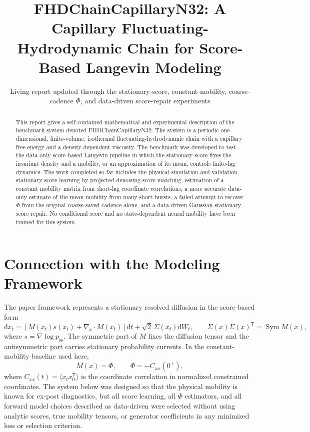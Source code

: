 \documentclass[11pt]{article}
\title{FHDChainCapillaryN32: A Capillary Fluctuating-Hydrodynamic Chain for Score-Based Langevin Modeling}
\author{}
\date{Living report updated through the stationary-score, constant-mobility, coarse-cadence \(\Phi\), and data-driven score-repair experiments}
\newcommand{\dd}{\mathrm{d}}
\newcommand{\Sym}{\operatorname{Sym}}
\newcommand{\transpose}{\mathsf T}
\begin{document}
\maketitle

\begin{abstract}
This report gives a self-contained mathematical and experimental description of the benchmark system denoted FHDChainCapillaryN32.  The system is a periodic one-dimensional, finite-volume, isothermal fluctuating-hydrodynamic chain with a capillary free energy and a density-dependent viscosity.  The benchmark was developed to test the data-only score-based Langevin pipeline in which the stationary score fixes the invariant density and a mobility, or an approximation of its mean, controls finite-lag dynamics.  The work completed so far includes the physical simulation and validation, stationary score learning by projected denoising score matching, estimation of a constant mobility matrix from short-lag coordinate correlations, a more accurate data-only estimate of the mean mobility from many short bursts, a failed attempt to recover \(\Phi\) from the original coarse saved cadence alone, and a data-driven Gaussian stationary-score repair.  No conditional score and no state-dependent neural mobility have been trained for this system.
\end{abstract}

\section{Connection with the Modeling Framework}

The paper framework represents a stationary resolved diffusion in the score-based form
\begin{equation}
    \dd x_t
    =
    \left[
        M(x_t)s(x_t)+\nabla_x\!\cdot M(x_t)
    \right]\dd t
    +
    \sqrt{2}\,\Sigma(x_t)\dd W_t,
    \qquad
    \Sigma(x)\Sigma(x)^\transpose=\Sym M(x),
    \label{eq:score_based_sde}
\end{equation}
where \(s=\nabla\log p_{\mathrm{ss}}\).  The symmetric part of \(M\) fixes the diffusion tensor and the antisymmetric part carries stationary probability currents.  In the constant-mobility baseline used here,
\begin{equation}
    M(x)=\Phi,
    \qquad
    \Phi=-\dot C_{xx}(0^+),
    \label{eq:phi_definition}
\end{equation}
where \(C_{xx}(t)=\langle x_t x_0^\transpose\rangle\) is the coordinate correlation in normalized constrained coordinates.  The system below was designed so that the physical mobility is known for ex-post diagnostics, but all score learning, all \(\Phi\) estimators, and all forward model choices described as data-driven were selected without using analytic scores, true mobility tensors, or generator coefficients in any minimized loss or selection criterion.
\end{document}
